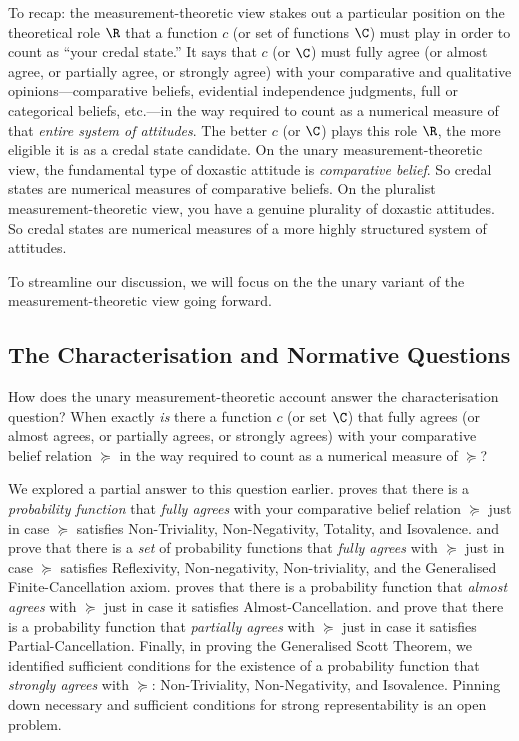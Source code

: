To recap: the measurement-theoretic view stakes out a particular position on the theoretical role $\R$ that a function $c$ (or set of functions $\C$) must play in order to count as ``your credal state.'' It says that $c$ (or $\C$) must fully agree (or almost agree, or partially agree, or strongly agree) with your comparative and qualitative opinions---comparative beliefs, evidential independence judgments, full or categorical beliefs, etc.---in the way required to count as a numerical measure of that \emph{entire system of attitudes}. The better $c$ (or $\C$) plays this role $\R$, the more eligible it is as a credal state candidate. On the unary measurement-theoretic view, the fundamental type of doxastic attitude is \textit{comparative belief}. So credal states are numerical measures of comparative beliefs. On the pluralist measurement-theoretic view, you have a genuine plurality of doxastic attitudes. So credal states are numerical measures of a more highly structured system of attitudes.

To streamline our discussion, we will focus on the the unary variant of the measurement-theoretic view going forward.










\subsection{The Characterisation and Normative Questions}

How does the unary measurement-theoretic account answer the characterisation question? When exactly \textit{is} there a function $c$ (or set $\C$) that fully agrees (or almost agrees, or partially agrees, or strongly agrees) with your comparative belief relation $\succeq$ in the way required to count as a numerical measure of $\succeq$?


We explored a partial answer to this question earlier. \citet{Scott1964} proves that there is a \textit{probability function} that \textit{fully agrees} with your comparative belief relation $\succeq$ just in case $\succeq$ satisfies Non-Triviality, Non-Negativity, Totality, and Isovalence. \citet{Rios1992} and \citet{Alon2014} prove that there is a \textit{set} of probability functions that \textit{fully agrees} with $\succeq$ just in case $\succeq$ satisfies Reflexivity, Non-negativity, Non-triviality, and the Generalised Finite-Cancellation axiom. \citet{Kraft1959} proves that there is a probability function that \textit{almost agrees} with $\succeq$ just in case it satisfies Almost-Cancellation. \citet{Adams1965} and \citet{Fishburn1969} prove that there is a probability function that \textit{partially agrees} with $\succeq$ just in case it satisfies Partial-Cancellation. Finally, in proving the Generalised Scott Theorem, we identified sufficient conditions for the existence of a probability function that \textit{strongly agrees} with $\succeq$: Non-Triviality, Non-Negativity, and Isovalence. Pinning down necessary and sufficient conditions for strong representability is an open problem.

